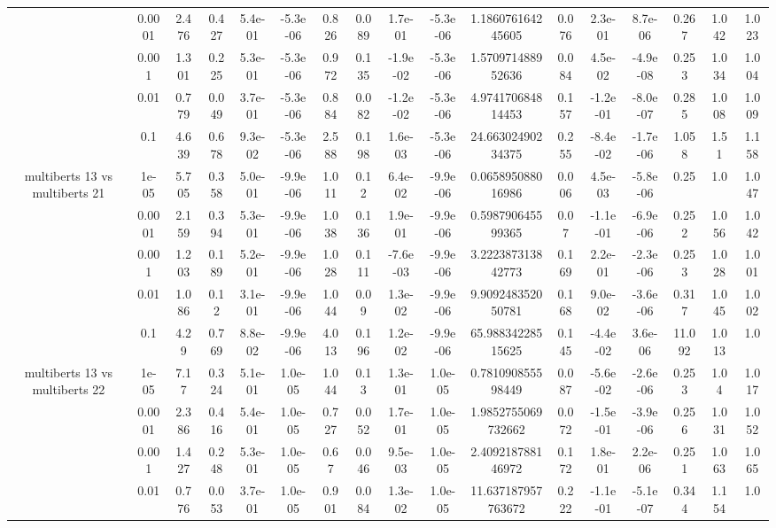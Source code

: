 \begin{tabular}{|c|c|c|c|c|c|c|c|c|c|c|c|c|c|c|c|c|}
 & 0.0001 & 2.476 & 0.427 & 5.4e-01 & -5.3e-06 & 0.826 & 0.089 & 1.7e-01 & -5.3e-06 & 1.186076164245605 & 0.076 & 2.3e-01 & 8.7e-06 & 0.267 & 1.042 & 1.023 \\
 & 0.001 & 1.301 & 0.225 & 5.3e-01 & -5.3e-06 & 0.972 & 0.135 & -1.9e-02 & -5.3e-06 & 1.570971488952636 & 0.084 & 4.5e-02 & -4.9e-08 & 0.253 & 1.034 & 1.004 \\
 & 0.01 & 0.779 & 0.049 & 3.7e-01 & -5.3e-06 & 0.884 & 0.082 & -1.2e-02 & -5.3e-06 & 4.974170684814453 & 0.157 & -1.2e-01 & -8.0e-07 & 0.285 & 1.008 & 1.009 \\
 & 0.1 & 4.639 & 0.678 & 9.3e-02 & -5.3e-06 & 2.588 & 0.198 & 1.6e-03 & -5.3e-06 & 24.66302490234375 & 0.255 & -8.4e-02 & -1.7e-06 & 1.058 & 1.51 & 1.158 \\
\hline
\multirow{5}{*}{multiberts 13 vs multiberts 21} & 1e-05 & 5.705 & 0.358 & 5.0e-01 & -9.9e-06 & 1.011 & 0.12 & 6.4e-02 & -9.9e-06 & 0.065895088016986 & 0.006 & 4.5e-03 & -5.8e-06 & 0.25 & 1.0 & 1.047 \\
 & 0.0001 & 2.159 & 0.394 & 5.3e-01 & -9.9e-06 & 1.038 & 0.136 & 1.9e-01 & -9.9e-06 & 0.598790645599365 & 0.07 & -1.1e-01 & -6.9e-06 & 0.252 & 1.056 & 1.042 \\
 & 0.001 & 1.203 & 0.189 & 5.2e-01 & -9.9e-06 & 1.028 & 0.111 & -7.6e-03 & -9.9e-06 & 3.222387313842773 & 0.169 & 2.2e-01 & -2.3e-06 & 0.253 & 1.028 & 1.001 \\
 & 0.01 & 1.086 & 0.12 & 3.1e-01 & -9.9e-06 & 1.044 & 0.09 & 1.3e-02 & -9.9e-06 & 9.909248352050781 & 0.168 & 9.0e-02 & -3.6e-06 & 0.317 & 1.045 & 1.002 \\
 & 0.1 & 4.29 & 0.769 & 8.8e-02 & -9.9e-06 & 4.013 & 0.196 & 1.2e-02 & -9.9e-06 & 65.98834228515625 & 0.145 & -4.4e-02 & 3.6e-06 & 11.092 & 1.013 & 1.0 \\
\hline
\multirow{5}{*}{multiberts 13 vs multiberts 22} & 1e-05 & 7.17 & 0.324 & 5.1e-01 & 1.0e-05 & 1.044 & 0.13 & 1.3e-01 & 1.0e-05 & 0.781090855598449 & 0.087 & -5.6e-02 & -2.6e-06 & 0.253 & 1.04 & 1.017 \\
 & 0.0001 & 2.386 & 0.416 & 5.4e-01 & 1.0e-05 & 0.727 & 0.052 & 1.7e-01 & 1.0e-05 & 1.9852755069732662 & 0.072 & -1.5e-01 & -3.9e-06 & 0.256 & 1.031 & 1.052 \\
 & 0.001 & 1.427 & 0.248 & 5.3e-01 & 1.0e-05 & 0.67 & 0.046 & 9.5e-03 & 1.0e-05 & 2.409218788146972 & 0.172 & 1.8e-01 & 2.2e-06 & 0.251 & 1.063 & 1.065 \\
 & 0.01 & 0.776 & 0.053 & 3.7e-01 & 1.0e-05 & 0.901 & 0.084 & 1.3e-02 & 1.0e-05 & 11.637187957763672 & 0.222 & -1.1e-01 & -5.1e-07 & 0.344 & 1.154 & 1.0 \\

\end{tabular}
